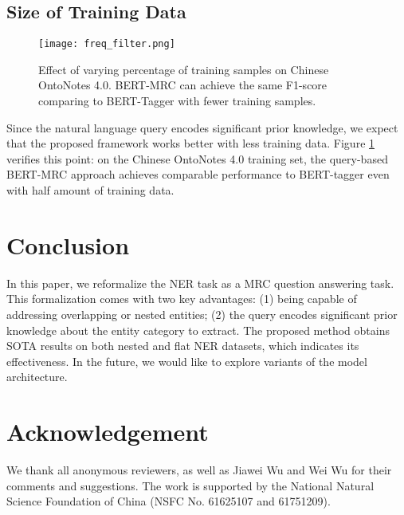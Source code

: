 \documentclass[11pt,a4paper]{article}
\begin{document}
\subsection{Size of Training Data}

\begin{figure}
\texttt{[image: freq\_filter.png]}
\centering
\caption{
Effect of varying percentage of training samples on Chinese OntoNotes 4.0. BERT-MRC can achieve the same F1-score comparing to BERT-Tagger with fewer training samples. }
\label{train-samples}
\end{figure}


Since the natural language query encodes significant prior knowledge,  we expect that the proposed framework works better with less training data. 
Figure \ref{train-samples} verifies this point: 
on the Chinese OntoNotes 4.0 training set, 
the query-based BERT-MRC approach achieves comparable performance to BERT-tagger even with half amount of training data.



\section{Conclusion}
In this paper, we reformalize the NER task as a MRC question answering task. This formalization comes with two key advantages: (1) being capable of addressing overlapping or nested entities; (2) the query encodes significant prior knowledge about the entity category to extract. The proposed method obtains SOTA results on both nested and flat NER datasets, which indicates its effectiveness. 
In the future, we would like to explore variants of the model architecture. 

\section*{Acknowledgement}
We thank all anonymous reviewers, as well as Jiawei Wu and Wei Wu for their comments and suggestions. 
The work is supported by the National Natural Science Foundation of China (NSFC No. 61625107 and 61751209). 



\end{document}
